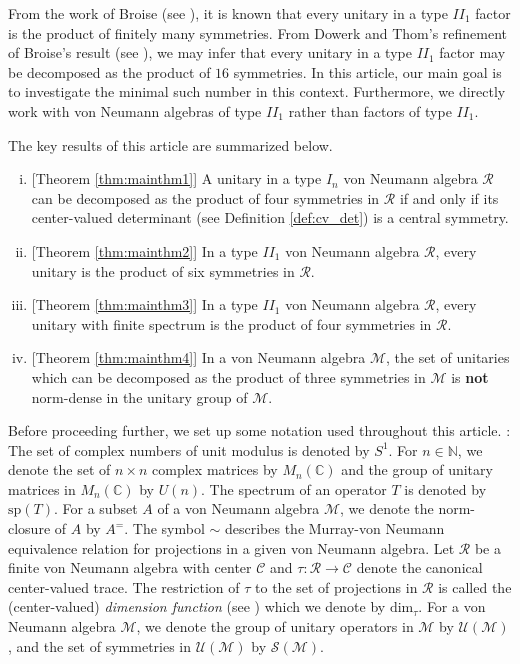\documentclass[12pt, preprint]{amsart}
\newcommand{\C}{\mathbb{C}}
\newcommand{\N}{\mathbb{N}}
\theoremstyle{definition}
\theoremstyle{remark}
\numberwithin{equation}{section}
\theoremstyle{ser}
\theoremstyle{serr}
\theoremstyle{ser}
\begin{document}
From the work of Broise (see \cite{broise}), it is known that every unitary in a type $II_1$ factor is the product of finitely many symmetries. From Dowerk and Thom's refinement of Broise's result (see \cite[Theorem 3.1]{dowerk_thom}), we may infer that every unitary in a type $II_1$ factor may be decomposed as the product of $16$ symmetries. In this article, our main goal is to investigate the minimal such number in this context. Furthermore, we directly work with von Neumann algebras of type $II_1$ rather than factors of type $II_1$.

The key results of this article are summarized below.
\vskip 0.05in
\begin{enumerate}[(i)]
    \item {[}Theorem \ref{thm:mainthm1}{]} A unitary in a type $I_n$ von Neumann algebra $\mathscr{R}$ can be decomposed as the product of four symmetries in $\mathscr{R}$ if and only if its center-valued determinant (see Definition \ref{def:cv_det}) is a central symmetry.
    \item {[}Theorem \ref{thm:mainthm2}{]} In a type $II_1$ von Neumann algebra $\mathscr{R}$, every unitary is the product of six symmetries in $\mathscr{R}$.
    \item {[}Theorem \ref{thm:mainthm3}{]} In a type $II_1$ von Neumann algebra $\mathscr{R}$, every unitary with finite spectrum is the product of four symmetries in $\mathscr{R}$.
    \item {[}Theorem \ref{thm:mainthm4}{]} In a von Neumann algebra $\mathscr{M}$, the set of unitaries which can be decomposed as the product of three symmetries in $\mathscr{M}$ is {\bf not} norm-dense in the unitary group of $\mathscr{M}$.
\end{enumerate}
 
Before proceeding further, we set up some notation used throughout this article.
\vskip 0.1in
: The set of complex numbers of unit modulus is denoted by $S^1$. For $n \in \N$, we denote the set of $n \times n$ complex matrices by $M_n(\C)$ and the group of unitary matrices in $M_n(\C)$ by $U(n)$. The spectrum of an operator $T$ is denoted by $\mathrm{sp}(T)$. For a subset $A$ of a von Neumann algebra $\mathscr{M}$, we denote the norm-closure of $A$ by $A^{=}$. The symbol $\sim$ describes the Murray-von Neumann equivalence relation for projections in a given von Neumann algebra. Let $\mathscr{R}$ be a finite von Neumann algebra with center $\mathscr{C}$ and $\tau : \mathscr{R} \to \mathscr{C}$ denote the canonical center-valued trace. The restriction of $\tau$ to the set of projections in $\mathscr{R}$ is called the (center-valued) {\it dimension function} (see \cite{kadison-ringrose2}) which we denote by $\mathrm{dim}_{\tau}$.  For a von Neumann algebra $\mathscr{M}$, we denote the group of unitary operators in $\mathscr{M}$ by $\mathcal{U}(\mathscr{M})$, and the set of symmetries in $\mathcal{U}(\mathscr{M})$ by $\mathcal{S}(\mathscr{M})$.
\vskip 0.1in
\end{document}
